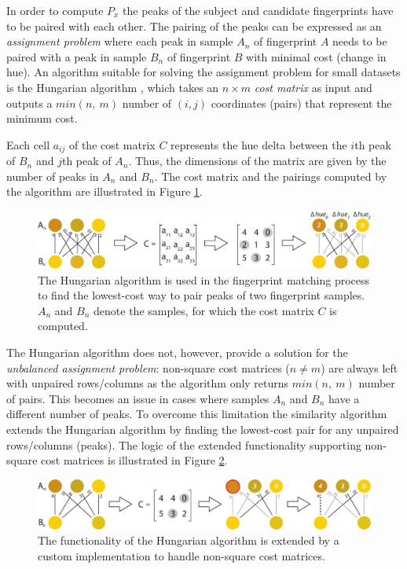 \documentclass[thesis.tex]{subfiles}
\begin{document}
In order to compute $P_x$ the peaks of the subject and candidate fingerprints have to be paired with each other. The pairing of the peaks can be expressed as an \emph{assignment problem} where each peak in sample $A_n$ of fingerprint $A$ needs to be paired with a peak in sample $B_n$ of fingerprint $B$ with minimal cost (change in hue). An algorithm suitable for solving the assignment problem for small datasets is the Hungarian algorithm \cite{hungarian_algorithm}, which takes an $n \times m$ \emph{cost matrix} as input and outputs a $min (n,\ m)$ number of $(i, j)$ coordinates (pairs) that represent the minimum cost.

Each cell $a_{ij}$ of the cost matrix $C$ represents the hue delta between the $i$th peak of $B_n$ and $j$th peak of $A_n$. Thus, the dimensions of the matrix are given by the number of peaks in $A_n$ and $B_n$. The cost matrix and the pairings computed by the algorithm are illustrated in Figure \ref{figure:hungarian-algorithm}.

\begin{figure}[h]
\centering \includegraphics[width=\textwidth,height=\textheight,keepaspectratio=true]{images/design_implementation/hungarian_algorithm}
\caption{The Hungarian algorithm is used in the fingerprint matching process to find the lowest-cost way to pair peaks of two fingerprint samples. $A_n$ and $B_n$ denote the samples, for which the cost matrix $C$ is computed.\label{figure:hungarian-algorithm}}
\end{figure}

The Hungarian algorithm does not, however, provide a solution for the \emph{unbalanced assignment problem}: non-square cost matrices ($n \neq m$) are always left with unpaired rows/columns as the algorithm only returns $min (n,\ m)$ number of pairs. This becomes an issue in cases where samples $A_n$ and $B_n$ have a different number of peaks. To overcome this limitation the similarity algorithm extends the Hungarian algorithm by finding the lowest-cost pair for any unpaired rows/columns (peaks). The logic of the extended functionality supporting non-square cost matrices is illustrated in Figure \ref{figure:hungarian-algorithm-extended}.

\begin{figure}[h]
\centering \includegraphics[width=\textwidth,height=\textheight,keepaspectratio=true]{images/design_implementation/hungarian_algorithm_ext}
\caption{The functionality of the Hungarian algorithm is extended by a custom implementation to handle non-square cost matrices.\label{figure:hungarian-algorithm-extended}}
\end{figure}
\end{document}
